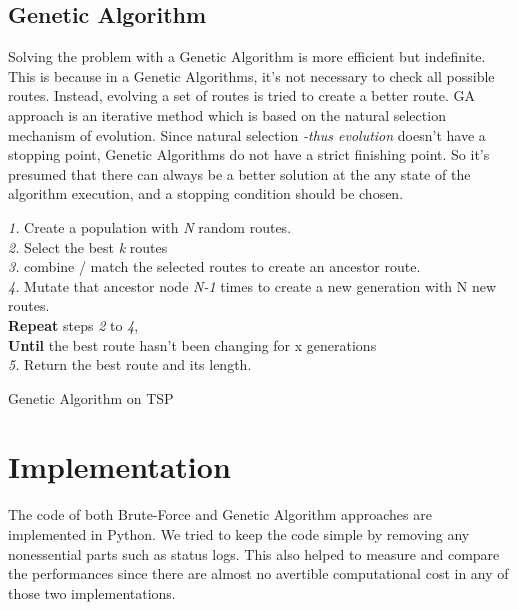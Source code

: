 \documentclass[journal,transmag]{IEEEtran}
\begin{document}
    \subsection{Genetic Algorithm}

    Solving the problem with a Genetic Algorithm is more efficient but
    indefinite. This is because in a Genetic Algorithms, it's not necessary to check all
    possible routes. Instead, evolving a set of routes is tried to create a
    better route. GA approach is an iterative method which is based on the
    natural selection mechanism of evolution. Since natural selection
    \textit{-thus evolution} doesn't have a stopping point, Genetic Algorithms
    do not have a strict finishing point. So it's presumed that there can always be
    a better solution at the any state of the algorithm execution, and a
    stopping condition should be chosen.

    \begin{algorithm} %
        \textit{1.} Create a population with \textit{N} random routes. \\
        \textit{2.} Select the best \textit{k} routes \\
        \textit{3.} combine / match the selected routes to create an ancestor
        route. \\
        \textit{4.} Mutate that ancestor node \textit{N-1} times to create a new
        generation with N new routes. \\
        \textbf{Repeat} steps \textit{2} to \textit{4}, \\
        \textbf{Until} the best route hasn't been changing for x generations \\
        \textit{5.} Return the best route and its length.


        \caption{Genetic Algorithm on TSP} %
        \label{alg2} %

    \end{algorithm}

    \section{Implementation}

    The code \cite{code_repository} of both Brute-Force and Genetic Algorithm
    approaches are implemented in Python. We tried to keep the code simple by
    removing any nonessential parts such as status logs. This also helped to
    measure and compare the performances since there are almost no avertible
    computational cost in any of those two implementations.
\end{document}
